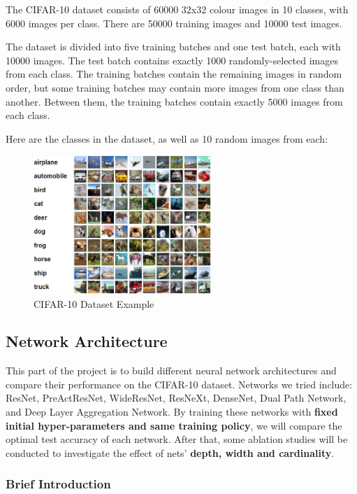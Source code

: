 \documentclass[a4paper, 11pt]{article} %
\begin{document}
The CIFAR-10 dataset consists of 60000 32x32 colour images in 10 classes, with 6000 images
per class. There are 50000 training images and 10000 test images.

The dataset is divided into five training batches and one test batch, each with 10000 images.
The test batch contains exactly 1000 randomly-selected images from each class. The training
batches contain the remaining images in random order, but some training batches may contain
more images from one class than another. Between them, the training batches contain exactly
5000 images from each class.

Here are the classes in the dataset, as well as 10 random images from each:

\begin{figure}[H]
	\centering
	\includegraphics[width=0.6\textwidth]{./img/cifar-10.jpg}
	\caption{CIFAR-10 Dataset Example}
\end{figure}

\subsection{\textbf{Network Architecture}}

This part of the project is to build different neural network architectures and compare
their performance on the CIFAR-10 dataset. Networks we tried include: ResNet, PreActResNet,
WideResNet, ResNeXt, DenseNet, Dual Path Network, and Deep Layer Aggregation Network. By
training these networks with \textbf{fixed initial hyper-parameters and same training policy},
we will compare the optimal test accuracy of each network. After that, some ablation studies
will be conducted to investigate the effect of nets' \textbf{depth, width and cardinality}.

\subsubsection{\textbf{Brief Introduction}}
\end{document}
